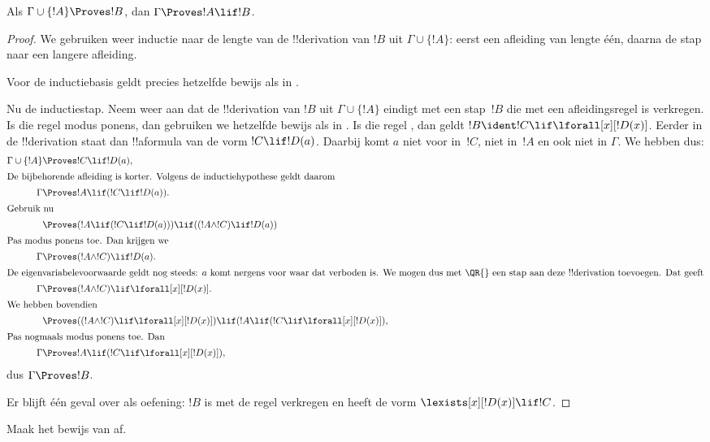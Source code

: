 \documentclass[../../../include/open-logic-section]{subfiles}
\begin{document}


\begin{thm}
 Als $\Gamma \cup \{!A\} \Proves !B$,
dan $\Gamma \Proves !A \lif !B$.
\end{thm}

\begin{proof}
We gebruiken weer inductie naar de lengte van de !!{derivation} van
$!B$ uit $\Gamma \cup \{!A\}$: eerst een afleiding van lengte één,
daarna de stap naar een langere afleiding.

Voor de inductiebasis geldt precies hetzelfde bewijs als in
.

Nu de inductiestap. Neem weer aan dat de !!{derivation} van $!B$ uit
$\Gamma \cup \{!A\}$ eindigt met een stap~$!B$ die met een
afleidingsregel is verkregen. Is die regel modus ponens, dan gebruiken
we hetzelfde bewijs als in . Is die regel
\QR, dan geldt $!B \ident !C \lif \lforall[x][!D(x)]$. Eerder in de
!!{derivation} staat dan !!a{formula} van de vorm $!C \lif !D(a)$.
Daarbij komt $a$ niet voor in~$!C$, niet in~$!A$ en ook niet in
$\Gamma$. We hebben dus:
\begin{align*}
  \Gamma \cup \{!A\} & \Proves !C \lif !D(a),\\
  \intertext{De bijbehorende afleiding is korter. Volgens de inductiehypothese geldt daarom}
    \Gamma & \Proves !A \lif (!C \lif !D(a)).\\
  \intertext{Gebruik nu}
  & \Proves (!A \lif (!C \lif !D(a))) \lif ((!A \land !C) \lif !D(a))\\
  \intertext{Pas modus ponens toe. Dan krijgen we}
  \Gamma & \Proves (!A \land !C) \lif !D(a).\\
  \intertext{De eigenvariabelevoorwaarde geldt nog steeds: $a$ komt nergens voor waar dat verboden is. We mogen dus met \QR{} een stap aan deze !!{derivation} toevoegen. Dat geeft}
    \Gamma & \Proves (!A \land !C) \lif \lforall[x][!D(x)].\\
    \intertext{We hebben bovendien}
    & \Proves ((!A \land !C) \lif \lforall[x][!D(x)]) \lif (!A \lif (!C \lif \lforall[x][!D(x)]),\\
    \intertext{Pas nogmaals modus ponens toe. Dan}
    \Gamma & \Proves !A \lif (!C \lif \lforall[x][!D(x)]),
\end{align*}
dus $\Gamma \Proves !B$.

Er blijft één geval over als oefening: $!B$ is met de regel \QR{}
verkregen en heeft de vorm $\lexists[x][!D(x)] \lif !C$.
\end{proof}

\begin{prob}
  Maak het bewijs van  af.
\end{prob}
\end{document}

